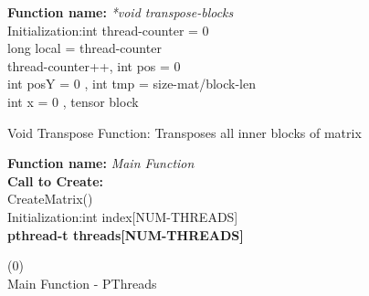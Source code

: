 \documentclass[10pt,journal]{article}
\begin{document}
\begin{algorithm}[H]
\SetAlgoLined
\textbf{Function name:} \emph{*void transpose-blocks}\\
Initialization\::int thread-counter = 0\\
    long local = thread-counter\\
    thread-counter++, int pos = 0\\
    int posY = 0 , int tmp = size-mat/block-len\\
    int x = 0 , tensor block\\

\vspace{10pt} 

\caption{Void Transpose Function: Transposes all inner blocks of matrix}
\end{algorithm}

\begin{algorithm}[H]
\SetAlgoLined
\textbf{Function name:} \emph{Main Function}\\
\textbf{Call to Create\::}\\
CreateMatrix()\\
Initialization\::int index[NUM-THREADS]\\

\textbf{pthread-t threads[NUM-THREADS]}

\vspace{10pt} 
\Return(0)\\

\caption{Main Function - PThreads}
\end{algorithm}
\end{document}
